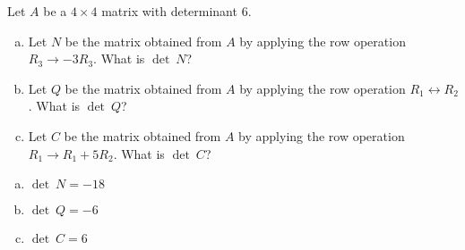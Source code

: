 
\begin{exerciseStatement}


Let \(A\) be a \(4 \times 4\) matrix with determinant \( 6 \).


\begin{enumerate}[(a)]
\item Let \(N\) be the matrix obtained from \(A\) by applying the row operation \( R_3 \to -3R_3 \). What is \(\operatorname{det}\ N\)?
\item Let \(Q\) be the matrix obtained from \(A\) by applying the row operation \( R_1 \leftrightarrow R_2 \). What is \(\operatorname{det}\ Q\)?
\item Let \(C\) be the matrix obtained from \(A\) by applying the row operation \( R_1 \to R_1 + 5R_2 \). What is \(\operatorname{det}\ C\)?
\end{enumerate}
    
\end{exerciseStatement}
    
\begin{exerciseAnswer} 

\begin{enumerate}[(a)]
\item \(\operatorname{det}\ N= -18 \)
\item \(\operatorname{det}\ Q= -6 \)
\item \(\operatorname{det}\ C= 6 \)
\end{enumerate}
    
\end{exerciseAnswer}
    
